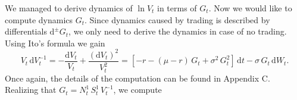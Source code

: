 We managed to derive dynamics of $\ln V_{t}$ in terms of $G_{t}$. Now we would like to compute dynamics $G_t$. Since dynamics caused by trading is described by differentials $\mathrm{d}^{\pm} G_t$, we only need to derive the dynamics in case of no trading. Using Ito's formula we gain
\begin{equation*}
V_t\,\mathrm{d} V_t^{-1} = -\frac{\mathrm{d}V_t}{V_t}+\frac{(\mathrm{d}V_t)^2}{V_t^2}=[-r-(\mu-r)\,G_t+\sigma^2\,G_t^2]\,\mathrm{d}t -\sigma\,G_t\,\mathrm{d}W_t.
\end{equation*}
Once again, the details of the computation can be found in Appendix C. Realizing that $G_t=N_t^1\,S_t^1\,V_t^{-1}$, we compute


